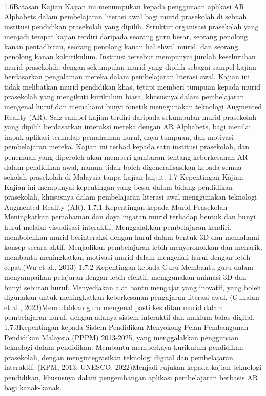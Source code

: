 1.6Batasan Kajian
Kajian ini menumpukan kepada penggunaan aplikasi AR Alphabets dalam pembelajaran literasi awal bagi murid prasekolah di sebuah institusi pendidikan prasekolah yang dipilih.
Struktur organisasi prasekolah yang menjadi tempat kajian terdiri daripada seorang guru besar, seorang penolong kanan pentadbiran, seorang penolong kanan hal ehwal murid, dan seorang penolong kanan kokurikulum. Institusi tersebut mempunyai jumlah keseluruhan murid prasekolah, dengan sekumpulan murid yang dipilih sebagai sampel kajian berdasarkan pengalaman mereka dalam pembelajaran literasi awal.
Kajian ini tidak melibatkan murid pendidikan khas, tetapi memberi tumpuan kepada murid prasekolah yang mengikuti kurikulum biasa, khususnya dalam pembelajaran mengenal huruf dan memahami bunyi fonetik menggunakan teknologi Augmented Reality (AR).
Saiz sampel kajian terdiri daripada sekumpulan murid prasekolah yang dipilih berdasarkan interaksi mereka dengan AR Alphabets, bagi menilai impak aplikasi terhadap pemahaman huruf, daya tumpuan, dan motivasi pembelajaran mereka.
Kajian ini terhad kepada satu institusi prasekolah, dan penemuan yang diperoleh akan memberi gambaran tentang keberkesanan AR dalam pendidikan awal, namun tidak boleh digeneralisasikan kepada semua sekolah prasekolah di Malaysia tanpa kajian lanjut.
1.7 Kepentingan Kajian
Kajian ini mempunyai kepentingan yang besar dalam bidang pendidikan prasekolah, khususnya dalam pembelajaran literasi awal menggunakan teknologi Augmented Reality (AR).
1.7.1 Kepentingan kepada Murid Prasekolah
Meningkatkan pemahaman dan daya ingatan murid terhadap bentuk dan bunyi huruf melalui visualisasi interaktif.  Menggalakkan pembelajaran kendiri, membolehkan murid berinteraksi dengan huruf dalam bentuk 3D dan memahami konsep secara aktif. Menjadikan pembelajaran lebih menyeronokkan dan menarik, membantu meningkatkan motivasi murid dalam mengenali huruf dengan lebih cepat.(Wu et al., 2013)
1.7.2 Kepentingan kepada Guru
Membantu guru dalam menyampaikan pelajaran dengan lebih efektif, menggunakan animasi 3D dan bunyi sebutan huruf. Menyediakan alat bantu mengajar yang inovatif, yang boleh digunakan untuk meningkatkan keberkesanan pengajaran literasi awal. (Gunalan et al., 2023)Memudahkan guru mengenal pasti kesulitan murid dalam pembelajaran huruf, dengan adanya sistem interaktif dan maklum balas digital.
1.7.3Kepentingan kepada Sistem Pendidikan
Menyokong Pelan Pembangunan Pendidikan Malaysia (PPPM) 2013-2025, yang menggalakkan penggunaan teknologi dalam pendidikan. Membantu memperkaya kurikulum pendidikan prasekolah, dengan mengintegrasikan teknologi digital dan pembelajaran interaktif. (KPM, 2013; UNESCO, 2022)Menjadi rujukan kepada kajian teknologi pendidikan, khususnya dalam pengembangan aplikasi pembelajaran berbasis AR bagi kanak-kanak.
